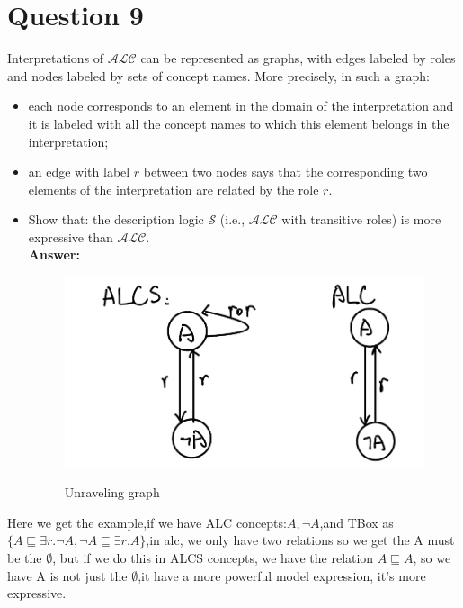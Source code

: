 \documentclass{article}
\begin{document}
    \section{Question 9}
    Interpretations of $\mathcal{ALC}$ can be represented as graphs, with edges labeled by roles and nodes labeled by sets of concept names. More precisely, in such a graph:
    \begin{itemize}
        \item[] each node corresponds to an element in the domain of the interpretation and it is labeled with all the concept names to which this element belongs in the interpretation;
        \item[] an edge with label $r$ between two nodes says that the corresponding two elements of the interpretation are related by the role $r$.
    \end{itemize}
    \begin{itemize}
    \item Show that: the description logic $\mathcal{S}$ (i.e., $\mathcal{ALC}$ with transitive roles) is more expressive than $\mathcal{ALC}$.\\
    \textbf{Answer:}\\
    \begin{figure}[H]
        \centering
        \includegraphics[width=1\textwidth]{4.png}\\
        \caption{Unraveling graph}
        \label{fig:Unraveling}
    \end{figure}  
    \end{itemize}
    Here we get the example,if we have ALC concepts:$A,\lnot A$,and TBox as $\{A \sqsubseteq \exists r.\lnot A, \lnot A \sqsubseteq \exists r.A\}$,in alc, we only have two relations so we get the A must be the $\emptyset$, but if we do this in ALCS concepts, we
    have the relation $A \sqsubseteq A$, so we have A is not just the $\emptyset$,it have a more powerful model expression, it's more expressive.\\
\end{document}

